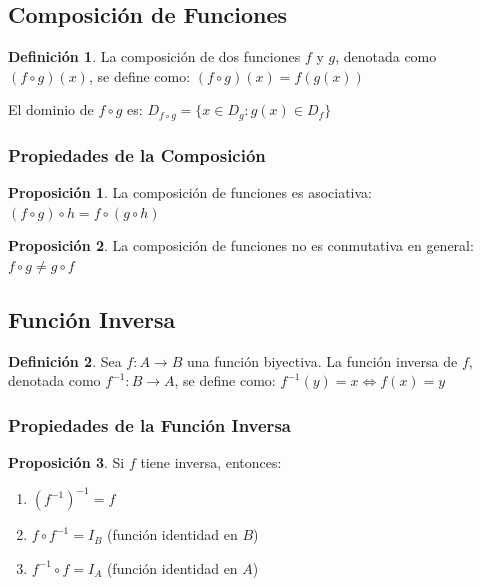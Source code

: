 \documentclass[12pt, a4paper, oneside]{book}
\theoremstyle{definition}
\newtheorem{definicion}{Definición}[chapter]
\newtheorem{proposicion}{Proposición}[chapter]
\begin{document}
\subsection{Composición de Funciones}

\begin{definicion}
La composición de dos funciones $f$ y $g$, denotada como $(f \circ g)(x)$, se define como:
$(f \circ g)(x) = f(g(x))$
\end{definicion}

El dominio de $f \circ g$ es:
$D_{f \circ g} = \{x \in D_g : g(x) \in D_f\}$

\subsubsection{Propiedades de la Composición}

\begin{proposicion}
La composición de funciones es asociativa:
$(f \circ g) \circ h = f \circ (g \circ h)$
\end{proposicion}

\begin{proposicion}
La composición de funciones no es conmutativa en general:
$f \circ g \neq g \circ f$
\end{proposicion}

\subsection{Función Inversa}

\begin{definicion}
Sea $f: A \rightarrow B$ una función biyectiva. La función inversa de $f$, denotada como $f^{-1}: B \rightarrow A$, se define como:
$f^{-1}(y) = x \Leftrightarrow f(x) = y$
\end{definicion}

\subsubsection{Propiedades de la Función Inversa}

\begin{proposicion}
Si $f$ tiene inversa, entonces:
\begin{enumerate}
    \item $(f^{-1})^{-1} = f$
    \item $f \circ f^{-1} = I_B$ (función identidad en $B$)
    \item $f^{-1} \circ f = I_A$ (función identidad en $A$)
\end{enumerate}
\end{proposicion}
\end{document}

